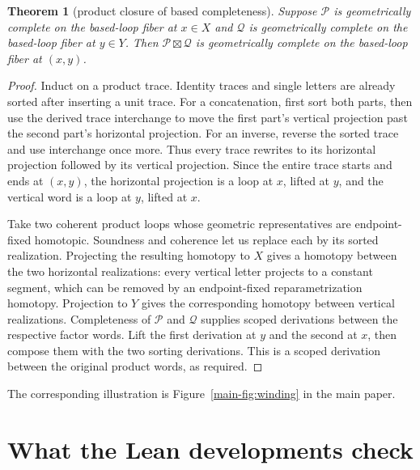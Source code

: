 \documentclass[10pt,reqno]{amsart}
\theoremstyle{definition}
\theoremstyle{plain}
\newtheorem{theorem}[definition]{Theorem}
\theoremstyle{remark}
\begin{document}
\begin{theorem}[product closure of based completeness]
\label{thm:product-completeness}
Suppose $\mathcal P$ is geometrically complete on the based-loop fiber at
$x\in X$ and $\mathcal Q$ is geometrically complete on the based-loop
fiber at $y\in Y$.  Then $\mathcal P\boxtimes\mathcal Q$ is geometrically
complete on the based-loop fiber at $(x,y)$.
\end{theorem}

\begin{proof}
Induct on a product trace.  Identity traces and single letters are already
sorted after inserting a unit trace.  For a concatenation, first sort both
parts, then use the derived trace interchange to move the first part's
vertical projection past the second part's horizontal projection.
For an inverse, reverse the sorted trace and use interchange once more.
Thus every trace rewrites to its horizontal projection followed by its
vertical projection.  Since the
entire trace starts and ends at $(x,y)$, the horizontal projection is a loop at
$x$, lifted at $y$, and the vertical word is a loop at $y$, lifted at $x$.

Take two coherent product loops whose geometric representatives are
endpoint-fixed homotopic.  Soundness and coherence let us replace each by
its sorted realization.  Projecting the resulting homotopy to $X$ gives a
homotopy between the two horizontal realizations: every vertical letter
projects to a constant segment, which can be removed by an endpoint-fixed
reparametrization homotopy.  Projection to $Y$ gives the corresponding
homotopy between vertical realizations.  Completeness of $\mathcal P$ and
$\mathcal Q$ supplies scoped derivations between the respective factor
words.  Lift the first derivation at $y$ and the second at $x$, then compose
them with the two sorting derivations.  This is a scoped derivation between
the original product words, as required.
\end{proof}

The corresponding illustration is Figure~\ref{main-fig:winding} in the main paper.



\section{What the Lean developments check}
\label{sec:formalization}
\end{document}
